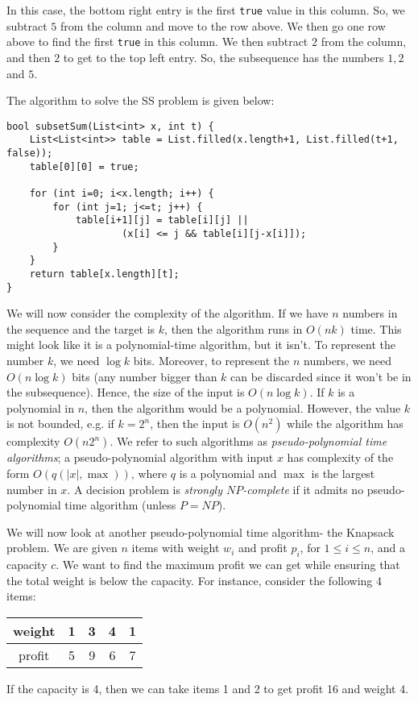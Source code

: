 \documentclass[a4paper, openany]{memoir}
\begin{document}
    \noindent In this case, the bottom right entry is the first \texttt{true} value in this column. So, we subtract $5$ from the column and move to the row above. We then go one row above to find the first \texttt{true} in this column. We then subtract $2$ from the column, and then $2$ to get to the top left entry. So, the subsequence has the numbers $1, 2$ and $5$.

    The algorithm to solve the SS problem is given below:
\begin{lstlisting}[language=pseudocode]
bool subsetSum(List<int> x, int t) {
    List<List<int>> table = List.filled(x.length+1, List.filled(t+1, false));
    table[0][0] = true;

    for (int i=0; i<x.length; i++) {
        for (int j=1; j<=t; j++) {
            table[i+1][j] = table[i][j] || 
                    (x[i] <= j && table[i][j-x[i]]);
        }
    }
    return table[x.length][t];
}
\end{lstlisting}
    We will now consider the complexity of the algorithm. If we have $n$ numbers in the sequence and the target is $k$, then the algorithm runs in $O(nk)$ time. This might look like it is a polynomial-time algorithm, but it isn't. To represent the number $k$, we need $\log k$ bits. Moreover, to represent the $n$ numbers, we need $O(n \log k)$ bits (any number bigger than $k$ can be discarded since it won't be in the subsequence). Hence, the size of the input is $O(n \log k)$. If $k$ is a polynomial in $n$, then the algorithm would be a polynomial. However, the value $k$ is not bounded, e.g. if $k = 2^n$, then the input is $O(n^2)$ while the algorithm has complexity $O(n2^n)$. We refer to such algorithms as \emph{pseudo-polynomial time algorithms}; a pseudo-polynomial algorithm with input $x$ has complexity of the form $O(q(|x|, \max))$, where $q$ is a polynomial and $\max$ is the largest number in $x$. A decision problem is \emph{strongly $NP$-complete} if it admits no pseudo-polynomial time algorithm (unless $P = NP$).

    We will now look at another pseudo-polynomial time algorithm- the Knapsack problem. We are given $n$ items with weight $w_i$ and profit $p_i$, for $1 \leq i \leq n$, and a capacity $c$. We want to find the maximum profit we can get while ensuring that the total weight is below the capacity. For instance, consider the following 4 items:
    \begin{table}[H]
        \centering
        \begin{tabular}{c|cccc}
            weight & 1 & 3 & 4 & 1 \\
            \hline
            profit & 5 & 9 & 6 & 7 \\
        \end{tabular}
    \end{table}
    \noindent If the capacity is 4, then we can take items 1 and 2 to get profit 16 and weight 4.
\end{document}
